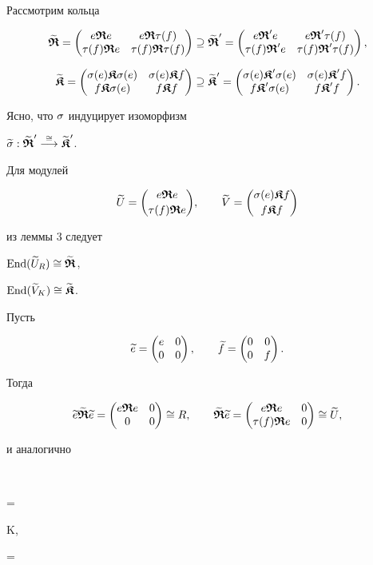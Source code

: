 \begin{pf} Рассмотрим кольца


$$


\widetilde{\R}=\mat{e\R e}{e\R\t(f)}{\t(f)\R e}{\t(f)\R\t(f)}


\supseteq


\widetilde{\R}'=\mat{e\R' e}{e\R'\t(f)}{\t(f)\R' e}{\t(f)\R'\t(f)},


$$


$$


\widetilde{\K}=\mat{\s(e)\K \s(e)}{\s(e)\K f}{f\K \s(e)}{f\K f}


\supseteq


\widetilde{\K}'=\mat{\s(e)\K'\s(e)}{\s(e)\K' f}{f \K' \s(e)}{f \K'f}.


$$


Ясно, что $\sigma$ индуцирует изоморфизм


$\widetilde{\sigma} :\widetilde{\boldsymbol{\frak R}}'\overset{\cong}{\longrightarrow}\widetilde{\boldsymbol{\frak K}}'$.


Для модулей


$$


\widetilde{U}=\colmn{e\R e}{\t(f)\R e}, \qquad


\widetilde{V}=\colmn{\s(e)\K f}{f\K f}


$$


из леммы 3 следует


$\operatorname{End}(\widetilde{U}_R)\cong \widetilde{\boldsymbol{\frak R}}$,


$\operatorname{End}(\widetilde{V}_K)\cong \widetilde{\boldsymbol{\frak K}}$.


Пусть


$$


\widetilde{e}=\mat{e}{0}{0}{0}, \qquad


\widetilde{f}=\mat{0}{0}{0}{f}.


$$


Тогда


$$


\widetilde{e}\widetilde{\R}\widetilde{e}=


\mat{e\R e}{0}{0}{0}\cong R, \qquad


\widetilde{\R}\widetilde{e}=\mat{e\R e}{0}{\t(f)\R e}{0}


\cong \widetilde{U},


$$


и аналогично


$$


\widetilde{\K}=


\cong K, \qquad


\widetilde{\K}=



\end{pf}
